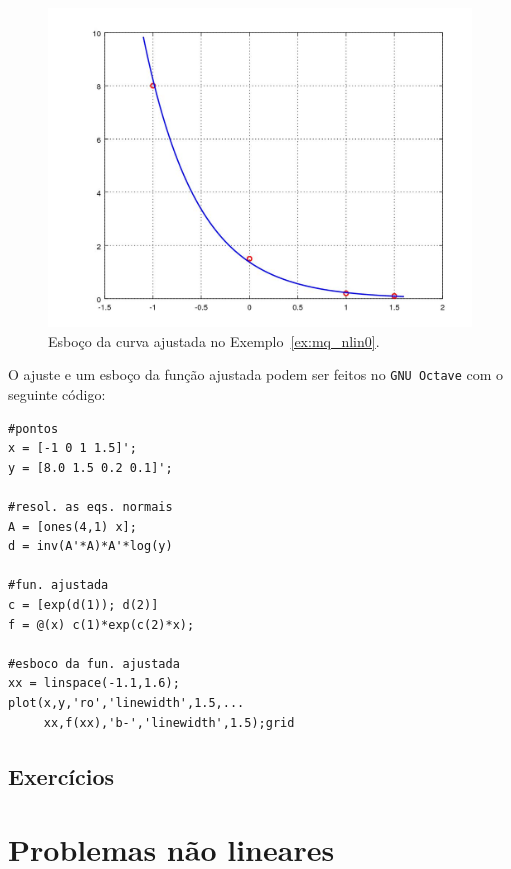\begin{ex}
\begin{figure}[h]
  \centering
  \includegraphics[width=\textwidth]{cap_ajuste/figs/ex_mq_nlin0/ex_mq_nlin0}
  \caption{Esboço da curva ajustada no Exemplo~\ref{ex:mq_nlin0}.}
  \label{fig:ex_mq_nlin0}
\end{figure}

\ifisoctave
O ajuste e um esboço da função ajustada podem ser feitos no \verb+GNU Octave+ com o seguinte código:
\begin{verbatim}
#pontos
x = [-1 0 1 1.5]';
y = [8.0 1.5 0.2 0.1]';

#resol. as eqs. normais
A = [ones(4,1) x];
d = inv(A'*A)*A'*log(y)

#fun. ajustada
c = [exp(d(1)); d(2)]
f = @(x) c(1)*exp(c(2)*x);

#esboco da fun. ajustada
xx = linspace(-1.1,1.6);
plot(x,y,'ro','linewidth',1.5,...
     xx,f(xx),'b-','linewidth',1.5);grid
\end{verbatim}
\fi

\end{ex}

\subsection*{Exercícios}

\emconstrucao

\section{Problemas não lineares}\label{c_ajuste_s_prob_nlin}

